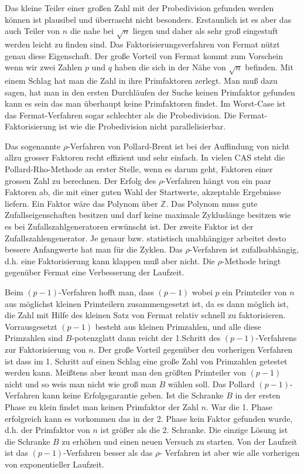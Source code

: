 \documentclass[a4paper,11pt]{article}
\begin{document}
Das kleine Teiler einer großen Zahl mit der Probedivision gefunden werden können
ist plausibel und überrascht nicht besonders. Erstaunlich ist es aber das auch
Teiler von $n$ die nahe bei $\sqrt{n}$ liegen und daher als sehr groß eingestuft
werden leicht zu finden sind. Das Faktorisierungsverfahren von Fermat nützt
genau diese Eigenschaft. Der große Vorteil von Fermat kommt zum Vorschein 
wenn wir zwei Zahlen $p$ und $q$ haben die sich in der Nähe von $\sqrt{n}$ 
befinden. Mit einem Schlag hat man die Zahl in ihre Primfaktoren zerlegt. Man 
muß dazu sagen, hat man in den ersten Durchläufen der Suche keinen Primfaktor
gefunden kann es sein das man überhaupt keine Primfaktoren findet. Im Worst-Case
ist das Fermat-Verfahren sogar schlechter als die Probedivision. Die 
Fermat-Faktorisierung ist wie die Probedivision nicht parallelisierbar.

Das sogenannte $\rho$-Verfahren von Pollard-Brent ist bei der Auffindung
von nicht allzu grosser Faktoren recht effizient und sehr einfach. In
vielen CAS steht die Pollard-Rho-Methode an erster Stelle, wenn es darum
geht, Faktoren einer grossen Zahl zu berechnen. Der Erfolg des $\rho$-Verfahren
hängt von ein paar Faktoren ab, die mit einer guten Wahl der Startwerte, 
akzeptable Ergebnisse liefern. Ein Faktor wäre das Polynom über $\mathbb Z$. 
Das Polynom muss gute Zufallseigenschaften besitzen und darf keine maximale
Zykluslänge besitzen wie es bei Zufallszahlgeneratoren erwünscht ist. Der zweite
Faktor ist der Zufallszahlengenerator. Je genaur bzw. statistisch unabhängiger
arbeitet desto bessere Anfangwerte hat man für die Zyklen. Das $\rho$-Verfahren
ist zufallsabhängig, d.h. eine Faktorisierung kann klappen muß aber nicht. Die  
$\rho$-Methode bringt gegenüber Fermat eine Verbesserung der Laufzeit.

Beim $(p-1)$-Verfahren hofft man, dass $(p-1)$ wobei $p$ ein Primteiler von $n$
aus möglichst kleinen Primteilern zusammengesetzt ist, da es dann möglich ist, die
Zahl mit Hilfe des kleinen Satz von Fermat relativ schnell zu faktorisieren.
Vorrausgesetzt $(p-1)$ besteht aus kleinen Primzahlen, und alle diese Primzahlen
sind $B$-potenzglatt dann reicht der 1.Schritt des $(p-1)$-Verfahrens zur
Faktorisierung von $n$. Der große Vorteil gegenüber den vorherigen Verfahren ist
dass im 1. Schritt auf einen Schlag eine große Zahl von Primzahlen getestet 
werden kann. Meißtens aber kennt man den größten Primteiler von $(p-1)$ nicht 
und so weis man nicht wie groß man $B$ wählen soll. 
Das Pollard $(p-1)$-Verfahren kann keine Erfolgsgarantie geben. Ist die Schranke
$B$
in der ersten Phase zu klein findet man keinen Primfaktor der Zahl $n$. War die
1. Phase erfolgreich kann es vorkommen das in der 2. Phase kein Faktor gefunden
wurde, d.h. der Primfaktor von $n$ ist größer als die 2. Schranke. Die einzige 
Lösung ist die Schranke $B$ zu erhöhen und einen neuen Versuch zu
starten. Von der Laufzeit ist das $(p-1)$-Verfahren besser als das $\rho$-
Verfahren ist aber wie alle vorherigen von exponentieller Laufzeit.
\end{document}
